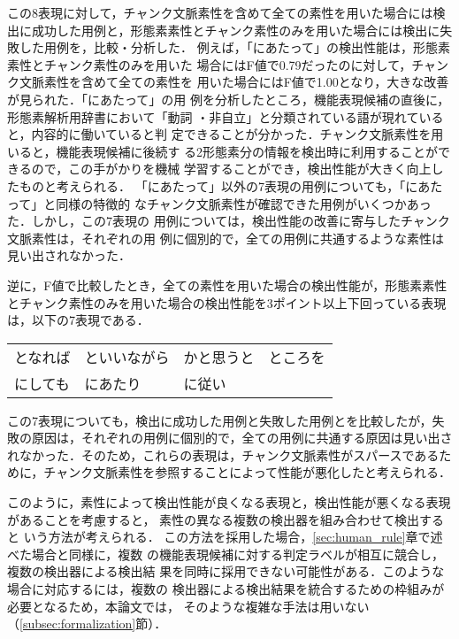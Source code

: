 \documentclass[japanese]{jnlp_1.2d}
\newlength{\NearBaselineskip}
\begin{document}
この8表現に対して，チャンク文脈素性を含めて全ての素性を用いた場合には検
出に成功した用例と，形態素素性とチャンク素性のみを用いた場合には検出に失
敗した用例を，比較・分析した．
例えば，「にあたって」の検出性能は，形態素素性とチャンク素性のみを用いた
場合にはF値で0.79だったのに対して，チャンク文脈素性を含めて全ての素性を
用いた場合にはF値で1.00となり，大きな改善が見られた．「にあたって」の用
例を分析したところ，機能表現候補の直後に，形態素解析用辞書において「動詞
・非自立」と分類されている語が現れていると，内容的に働いていると判
定できることが分かった．チャンク文脈素性を用いると，機能表現候補に後続す
る2形態素分の情報を検出時に利用することができるので，この手がかりを機械
学習することができ，検出性能が大きく向上したものと考えられる．
「にあたって」以外の7表現の用例についても，「にあたって」と同様の特徴的
なチャンク文脈素性が確認できた用例がいくつかあった．しかし，この7表現の
用例については，検出性能の改善に寄与したチャンク文脈素性は，それぞれの用
例に個別的で，全ての用例に共通するような素性は見い出されなかった．

逆に，F値で比較したとき，全ての素性を用いた場合の検出性能が，形態素素性
とチャンク素性のみを用いた場合の検出性能を3ポイント以上下回っている表現
は，以下の7表現である．
\vspace{\NearBaselineskip}
\begin{center}
  \begin{tabular}{llll}
    となれば & といいながら & かと思うと & ところを \\
    にしても & にあたり     & に従い
  \end{tabular}
\end{center}
\vspace{\NearBaselineskip}
この7表現についても，検出に成功した用例と失敗した用例とを比較したが，失
敗の原因は，それぞれの用例に個別的で，全ての用例に共通する原因は見い出さ
れなかった．そのため，これらの表現は，チャンク文脈素性がスパースであるた
めに，チャンク文脈素性を参照することによって性能が悪化したと考えられる．

このように，素性によって検出性能が良くなる表現と，検出性能が悪くなる表現
があることを考慮すると，
素性の異なる複数の検出器を組み合わせて検出すると
いう方法が考えられる．
この方法を採用した場合，\ref{sec:human_rule}章で述べた場合と同様に，複数
の機能表現候補に対する判定ラベルが相互に競合し，複数の検出器による検出結
果を同時に採用できない可能性がある．このような場合に対応するには，複数の
検出器による検出結果を統合するための枠組みが必要となるため，本論文では，
そのような複雑な手法は用いない（\ref{subsec:formalization}節）．
\end{document}
